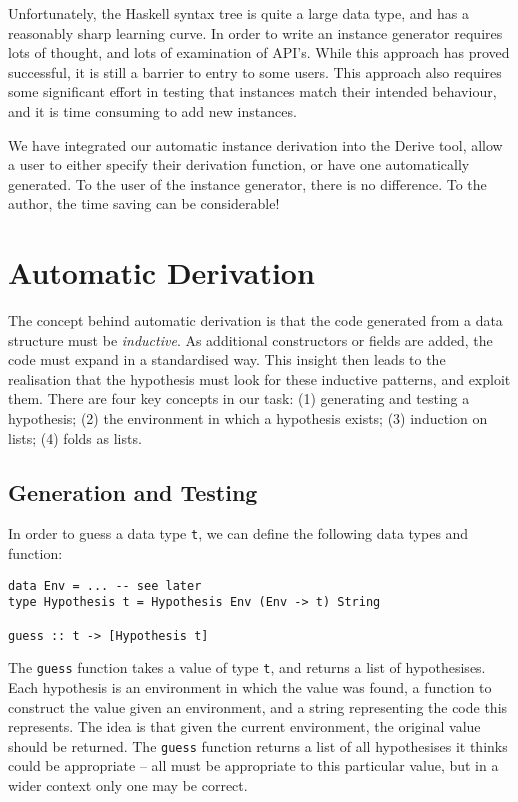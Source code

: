 \documentclass{llncs}
\newcommand{\T}[1]{\texttt{#1}}
\begin{document}
Unfortunately, the Haskell syntax tree is quite a large data type, and has a reasonably sharp learning curve. In order to write an instance generator requires lots of thought, and lots of examination of API's. While this approach has proved successful, it is still a barrier to entry to some users. This approach also requires some significant effort in testing that instances match their intended behaviour, and it is time consuming to add new instances.

We have integrated our automatic instance derivation into the Derive tool, allow a user to either specify their derivation function, or have one automatically generated. To the user of the instance generator, there is no difference. To the author, the time saving can be considerable!


\section{Automatic Derivation}

The concept behind automatic derivation is that the code generated from a data structure must be \textit{inductive}. As additional constructors or fields are added, the code must expand in a standardised way. This insight then leads to the realisation that the hypothesis must look for these inductive patterns, and exploit them. There are four key concepts in our task: (1) generating and testing a hypothesis; (2) the environment in which a hypothesis exists; (3) induction on lists; (4) folds as lists.

\subsection{Generation and Testing}

In order to guess a data type \T{t}, we can define the following data types and function:

\begin{verbatim}
data Env = ... -- see later
type Hypothesis t = Hypothesis Env (Env -> t) String

guess :: t -> [Hypothesis t]
\end{verbatim}

The \T{guess} function takes a value of type \T{t}, and returns a list of hypothesises. Each hypothesis is an environment in which the value was found, a function to construct the value given an environment, and a string representing the code this represents. The idea is that given the current environment, the original value should be returned. The \T{guess} function returns a list of all hypothesises it thinks could be appropriate -- all must be appropriate to this particular value, but in a wider context only one may be correct.
\end{document}
